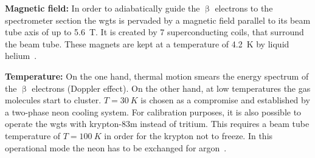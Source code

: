 {\par\textbf{Magnetic field:}
In order to adiabatically guide the $\upbeta$ electrons to the spectrometer section the \gls{wgts} is pervaded by a magnetic field parallel to its beam tube axis of up to \SI{5.6}{T}. It is created by 7 superconducting coils, that surround the beam tube. These magnets are kept at a temperature of \SI{4.2}{K} by liquid helium~\cite{Arenz2018}.}

{\par\textbf{Temperature:}
On the one hand, thermal motion smears the energy spectrum of the $\upbeta$ electrons (Doppler effect). On the other hand, at low temperatures the gas molecules start to cluster. $T=\SI{30}{K}$ is chosen as a compromise and established by a two-phase neon cooling system. For calibration purposes, it is also possible to operate the \gls{wgts} with krypton-83m instead of tritium. This requires a beam tube temperature of $T=\SI{100}{K}$ in order for the krypton not to freeze. In this operational mode the neon has to be exchanged for argon~\cite{Angrik:2005ep}.}
